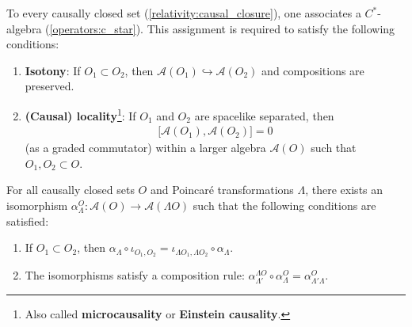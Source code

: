     \begin{axiom}\label{aqft:microcausality}
        To every causally closed set (\cref{relativity:causal_closure}), one associates a $C^*$-algebra (\cref{operators:c_star}). This assignment is required to satisfy the following conditions:
        \begin{enumerate}
            \item\textbf{Isotony}: If $O_1\subset O_2$, then $\mathcal{A}(O_1)\hookrightarrow\mathcal{A}(O_2)$ and compositions are preserved.
            \item\textbf{(Causal) locality}\footnote{Also called \textbf{microcausality} or \textbf{Einstein causality}.}: If $O_1$ and $O_2$ are spacelike separated, then
            \begin{gather}
                \bigl[\mathcal{A}(O_1),\mathcal{A}(O_2)\bigr]=0
            \end{gather}
            (as a graded commutator) within a larger algebra $\mathcal{A}(O)$ such that $O_1,O_2\subset O$.
        \end{enumerate}
    \end{axiom}

    \begin{axiom}
        For all causally closed sets $O$ and Poincar\'e transformations $\Lambda$, there exists an isomorphism $\alpha^O_\Lambda:\mathcal{A}(O)\rightarrow\mathcal{A}(\Lambda O)$ such that the following conditions are satisfied:
        \begin{enumerate}
            \item If $O_1\subset O_2$, then $\alpha_\Lambda\circ\iota_{O_1,O_2} = \iota_{\Lambda O_1,\Lambda O_2}\circ\alpha_\Lambda$.
            \item The isomorphisms satisfy a composition rule: $\alpha^{\Lambda O}_{\Lambda'}\circ\alpha^O_\Lambda = \alpha^O_{\Lambda'\Lambda}$.
        \end{enumerate}
    \end{axiom}

